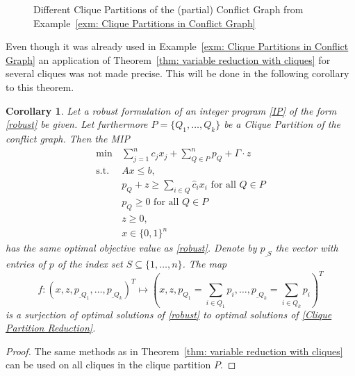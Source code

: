\documentclass[titlepage, a4paper]{amsbook}
\theoremstyle{plain}
\newtheorem{cor}[thm]{Corollary}
\theoremstyle{break}
\theoremstyle{definition}
\theoremstyle{remark}
\numberwithin{equation}{thm}
\begin{document}
\begin{figure}
\begin{subfigure}{0.3\textwidth}
\end{subfigure}
\caption{Different Clique Partitions of the (partial) Conflict Graph from Example~\ref{exm: Clique Partitions in Conflict Graph}}\label{img: Clique Partitions in Conflict Graph}
\end{figure}

Even though it was already used in Example~\ref{exm: Clique Partitions in Conflict Graph} an application of Theorem~\ref{thm: variable reduction with cliques} for several cliques was not made precise. This will be done in the following corollary to this theorem.
\begin{cor}
Let a robust formulation of an integer program \eqref{IP} of the form \eqref{robust} be given. Let furthermore $P=\{Q_1, \ldots, Q_k\}$ be a Clique Partition of the conflict graph. Then the MIP
\begin{equation}\label{Clique Partition Reduction}
\begin{split}
    \min\, &\sum_{j=1}^{n} c_j x_j + \sum_{Q \in P}^{n}p_Q + \Gamma \cdot z\\
    \text{s.t. } &Ax \leq b, \\
    &p_{Q}+ z \geq \sum_{i \in Q} \hat{c}_ix_i \text{ for all }Q \in P \\
  &p_Q \geq 0 \text{ for all }Q \in P \\
  &z \geq 0, \\
    &x \in \{0,1\}^n
\end{split}
\end{equation}
has the same optimal objective value as \eqref{robust}.
Denote by $p_{\_S}$ the vector with entries of $p$ of the index set $S \subseteq \{1, \ldots, n\}$. The map 
\[f:(x, z, p_{\_Q_1}, \ldots, p_{\_Q_k})^T \mapsto (x, z, p_{Q_1}=\sum_{i \in Q_1}p_i, \ldots,  p_{\_Q_k}=\sum_{i \in Q_k}p_i)^T \]
is a surjection of optimal solutions of \eqref{robust} to optimal solutions of \eqref{Clique Partition Reduction}.
\end{cor}
\begin{proof}
The same methods as in Theorem~\ref{thm: variable reduction with cliques} can be used on all cliques in the clique partition $P$.
\end{proof}
\end{document}
